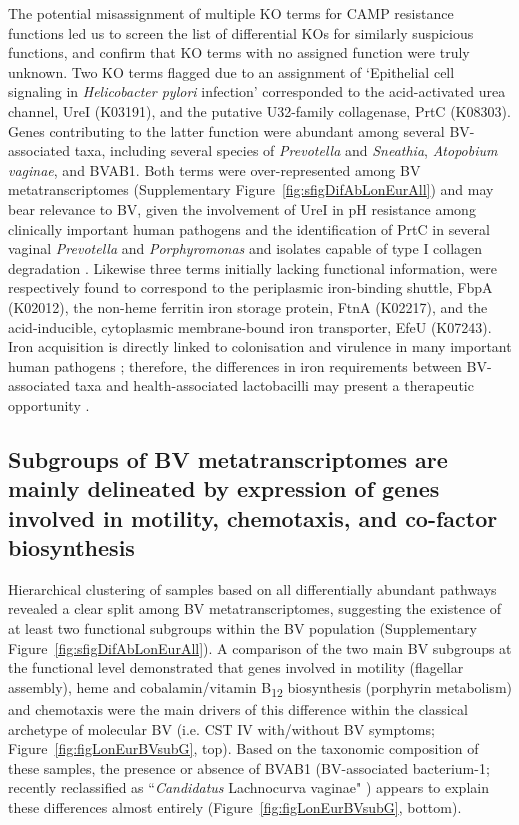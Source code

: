 \documentclass[sn-mathphys,Numbered]{sn-jnl}%
\begin{document}
The potential misassignment of multiple KO terms for CAMP resistance functions led us to screen the list of differential KOs for similarly suspicious functions, and confirm that KO terms with no assigned function were truly unknown. Two KO terms flagged due to an assignment of `Epithelial cell signaling in \textit{Helicobacter pylori} infection' corresponded to the acid-activated urea channel, UreI (K03191), and the putative U32-family collagenase, PrtC (K08303). Genes contributing to the latter function were abundant among several BV-associated taxa, including several species of \textit{Prevotella} and \textit{Sneathia}, \textit{Atopobium vaginae}, and BVAB1. Both terms were over-represented among BV metatranscriptomes (Supplementary Figure~\ref{fig:sfigDifAbLonEurAll}) and may bear relevance to BV, given the involvement of UreI in pH resistance among clinically important human pathogens \citep{strugatsky_structure_2013} and the identification of PrtC in several vaginal \textit{Prevotella} and \textit{Porphyromonas} and isolates capable of type I collagen degradation \citep{lithgow_porph_2022, lithgow_collagenase_2022}. Likewise three terms initially lacking functional information, were respectively found to correspond to the periplasmic iron-binding shuttle, FbpA (K02012), the non-heme ferritin iron storage protein, FtnA (K02217), and the acid-inducible, cytoplasmic membrane-bound iron transporter, EfeU (K07243). Iron acquisition is directly linked to colonisation and virulence in many important human pathogens \citep{chan_structural_2023}; therefore, the differences in iron requirements between BV-associated taxa and health-associated lactobacilli may present a  therapeutic opportunity \citep{weinberg_lactobacillus_1997}.

\subsection{Subgroups of BV metatranscriptomes are mainly delineated by expression of genes involved in motility, chemotaxis, and co-factor biosynthesis}\label{subsec:subsecBVsub}

Hierarchical clustering of samples based on all differentially abundant pathways revealed a clear split among BV metatranscriptomes, suggesting the existence of at least two functional subgroups within the BV population (Supplementary Figure~\ref{fig:sfigDifAbLonEurAll}). A comparison of the two main BV subgroups at the functional level demonstrated that genes involved in motility (flagellar assembly), heme and cobalamin/vitamin B\textsubscript{12} biosynthesis (porphyrin metabolism) and chemotaxis were the main drivers of this difference within the classical archetype of molecular BV (i.e. CST IV with/without BV symptoms; Figure~\ref{fig:figLonEurBVsubG}, top). Based on the taxonomic composition of these samples, the presence or absence of BVAB1 (BV-associated bacterium-1; recently reclassified as ``\textit{Candidatus} Lachnocurva vaginae" \citep{holm_comparative_2020}) appears to explain these differences almost entirely (Figure~\ref{fig:figLonEurBVsubG}, bottom).
\end{document}
